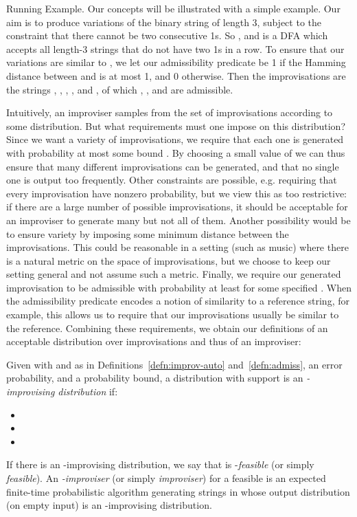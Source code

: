 \documentclass[a4paper,USenglish,numberwithinsect]{lipics}
\theoremstyle{plain}
\theoremstyle{definition}
\begin{document}
\begin{subparagraph}{Running Example.}
Our concepts will be illustrated with a simple 
example. Our aim is to produce variations of the binary string  of length 3, subject to the constraint that there cannot be two
consecutive 1s. So , and 
 is a DFA which accepts all length-3 strings 
that do not have two 1s in a row. To ensure that our
variations are similar to , we let our admissibility predicate
 be 1 if the Hamming distance between  and  is at
most 1, and 0 otherwise. Then the improvisations are the strings
, , , , and , of which , , and
 are admissible. \\
\end{subparagraph}

Intuitively, an improviser samples from the set of improvisations according to some
distribution. But what requirements must one impose on this distribution?  Since we want a variety
of improvisations, we require that each one is generated with probability at most some bound
. By choosing a small value of  we can thus ensure that many different improvisations
can be generated, and that no single one is output too frequently. Other constraints are possible,
e.g. requiring that every improvisation have nonzero probability, but we view this as too
restrictive: if there are a large number of possible improvisations, it should be acceptable for an
improviser to generate many but not all of them.
Another possibility would be to ensure variety by imposing some minimum distance between the improvisations.
This could be reasonable in a setting (such as music) where there is a natural metric on the space of improvisations, but we choose to keep our setting general and not assume such a metric.
Finally, we require our generated improvisation to
be admissible with probability at least  for some specified . When the
admissibility predicate encodes a notion of similarity to a reference string, for example, this allows us to
require that our improvisations usually be similar to the reference. Combining these requirements,
we obtain our definitions of an acceptable distribution over improvisations and thus of an
improviser:

\begin{definition}
Given 
with  and  as in
Definitions~\ref{defn:improv-auto} and~\ref{defn:admiss},  an error probability, and  a
probability 
bound, a distribution  with support  is an
\emph{-improvising distribution} if:
\begin{itemize}
\item 
\item 
\item 
\end{itemize}
If there is an -improvising distribution, we say that
 is -\emph{feasible} (or simply {\em feasible}). An 
\emph{-improviser} (or simply {\em improviser}) for a feasible  
is an expected finite-time
probabilistic algorithm generating strings in 
whose output distribution (on empty
input) is an -improvising distribution.
\label{defn:feasible}
\end{definition}
\end{document}
